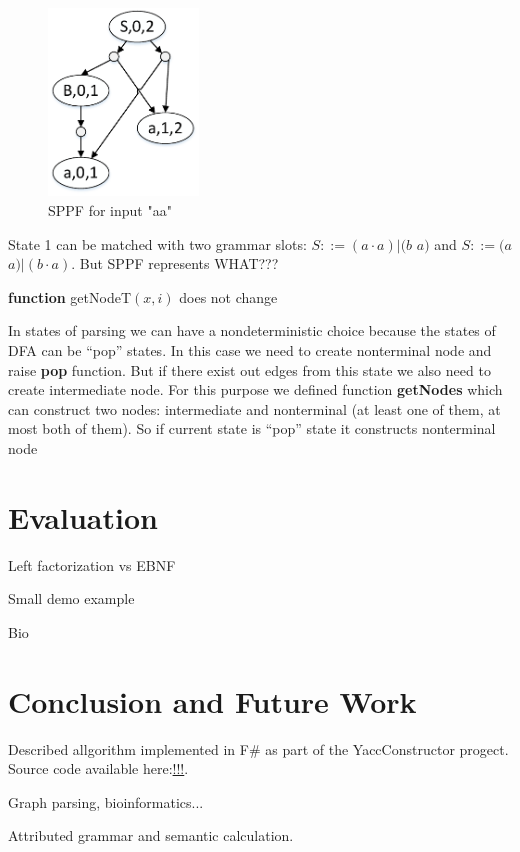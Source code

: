 \documentclass[runningheads,a4paper]{llncs}
\begin{document}
\begin{figure}
    \centering
    \includegraphics[width=4cm]{pictures/SPPFforG0.pdf}
    \caption{SPPF for input "aa"}
    \label{fig:SPPF}
\end{figure}


State 1 can be matched with two grammar slots: $S ::= (a \cdot a)|(b$ $a)$ and $S ::= (a$ $a)|(b \cdot a)$. 
But SPPF represents WHAT???




\textbf{function} getNodeT$(x,i)$ does not change

In states of parsing we can have a nondeterministic choice because the states of DFA can be ``pop'' states.
In this case we need to create nonterminal node and raise \textbf{pop} function. But if there exist out edges from this state we also need to create intermediate node.
For this purpose we defined function \textbf{getNodes} which can construct two nodes: intermediate and nonterminal (at least one of them, at most both of them).
So if current state is ``pop'' state it constructs nonterminal node






\section{Evaluation}

Left factorization vs EBNF

Small demo example

Bio


\section{Conclusion and Future Work}

Described allgorithm implemented in F\# as part of the YaccConstructor progect.
Source code available here:\url{!!!}.

Graph parsing, bioinformatics...

Attributed grammar and semantic calculation.





\end{document}
